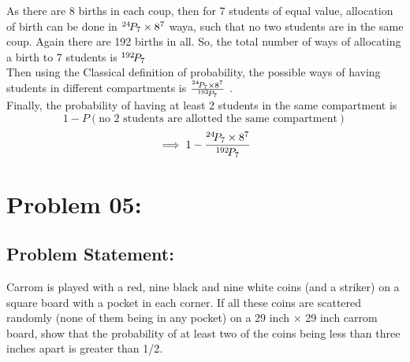 \documentclass{article}
\newcommand*{\permcomb}[4][0mu]{{{}^{#3}\mkern#1#2_{#4}}}
\newcommand*{\perm}[1][-3mu]{\permcomb[#1]{P}}
\theoremstyle{definition}
\begin{document}
As there are 8 births in each coup, then for 7 students of equal value, allocation of birth can be done in $\perm{24}{7} \times 8^7$ waya, such that no two students are in the same coup. Again there are 192 births in all. So, the total number of ways of allocating a birth to 7 students is $\perm{192}{7}$ \\
Then using the Classical definition of probability, the possible ways of having students in different compartments is $\frac{\perm{24}{7} \times 8^7}{\perm{192}{7}}$ .\\
Finally, the probability of having at least 2 students in the same compartment is \\
\[
1 - P(\text{no 2 students  are allotted the same compartment})
\]
\[
\implies 1 - \frac{\perm{24}{7} \times 8^7}{\perm{192}{7}}
\]




\section{Problem 05:}
\begin{mdframed}[style = MyFrame]

\subsection{Problem Statement:}

    Carrom is played with a red, nine black and nine white coins (and a striker) on a square board
with a pocket in each corner. If all these coins are scattered randomly (none of them being in
any pocket) on a 29 inch × 29 inch carrom board, show that the probability of at least two of
the coins being less than three inches apart is greater than 1/2.
\end{mdframed}
\end{document}
